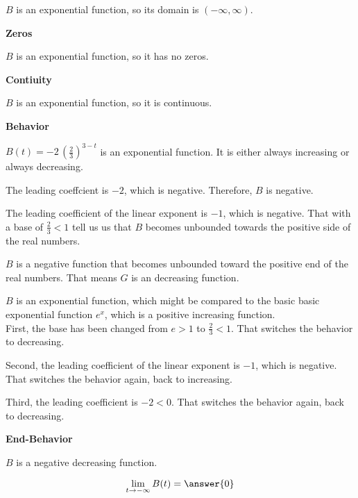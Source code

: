\documentclass{ximera}
\begin{document}
\begin{example}
$B$ is an exponential function, so its domain is $(-\infty, \infty)$.





\textbf{Zeros}


$B$ is an exponential function, so it has no zeros.




\textbf{Contiuity}


$B$ is an exponential function, so it is continuous.




\textbf{Behavior}

$B(t) = -2 \, \left( \frac{2}{3} \right)^{3-t}$ is an exponential function.  It  is either always increasing or always decreasing.


The leading coeffcient is $-2$, which is negative.  Therefore, $B$ is negative.

The leading coefficient of the linear exponent is $-1$, which is negative.  That with a base of $\frac{2}{3} < 1$ tell us us that $B$ becomes unbounded towards the positive side of the real numbers.


$B$ is a negative function that becomes unbounded toward the positive end of the real numbers.  That means $G$ is an decreasing function.



\begin{criterion}

$B$ is an exponential function, which might be compared to the basic basic exponential function $e^x$, which is a positive increasing function.\\


First, the base has been changed from $e > 1$ to $\frac{2}{3} < 1$.  That switches the behavior to decreasing.

Second, the leading coefficient of the linear exponent is $-1$, which is negative.  That switches the behavior again, back to increasing.


Third, the leading coefficient is $-2 < 0$. That switches the behavior again, back to decreasing.



\end{criterion}




\textbf{End-Behavior}


$B$ is a negative decreasing function.



\[
\lim\limits_{t \to -\infty}B(t) = \answer{0}  
\]


\end{example}
\end{document}
